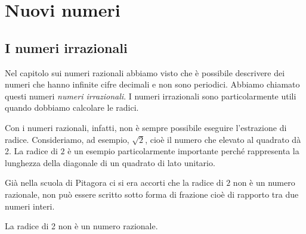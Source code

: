 \begin{comment}
C.E. \(\dfrac{x-1}{x+1}\geqslant 0\). 
Occorre discutere il segno della frazione \(f\), combinando il segno del 
numeratore \(N\) e del denominatore \(D\):

\begin{center}

\end{center}
Pertanto C.E. \(x<-1\vee x\geqslant 1\).
\end{esempio}
% 


\end{comment}

\section{Nuovi numeri}
\label{sec:radicali_reali}

\subsection{I numeri irrazionali}

Nel capitolo sui numeri razionali abbiamo visto che è possibile descrivere 
dei numeri che hanno infinite cifre decimali e non sono periodici.
Abbiamo chiamato questi numeri \emph{numeri irrazionali}.
I numeri irrazionali sono particolarmente utili quando dobbiamo calcolare 
le radici.

Con i numeri razionali, infatti, non è sempre possibile eseguire 
l'estrazione di radice. 
Consideriamo, ad esempio, \(\sqrt{2}\), cioè il numero che elevato al 
quadrato dà 2. 
La radice di \(2\) è un esempio particolarmente importante perché 
rappresenta la lunghezza della diagonale di un quadrato di lato unitario.


Già nella scuola di Pitagora ci si era accorti che la radice di \(2\) non 
è un numero razionale, non può essere scritto sotto forma di 
frazione cioè di rapporto tra due numeri interi. 

\begin{teorema}{}{}
La radice di 2 non è un numero razionale.
\end{teorema}

